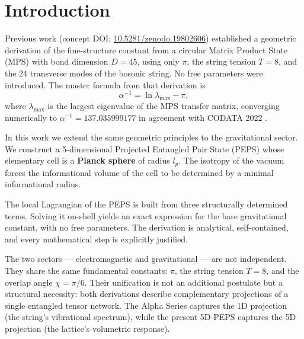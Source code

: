 \documentclass[12pt]{article}
\begin{document}
\begin{abstract}
\noindent\textbf{Keywords:} Lagrangian, quantum gravity, GUT, grand unified theory, PEPS, MPS, tensor networks, topological invariants, fine-structure constant, Alpha Series, Polyakov string, Planck sphere, holographic principle, spinorial projection, tesseract volume, bare gravitational coupling, dimensional reduction, lattice quantum field theory, Monte Carlo simulation, annealing, symmetry breaking, hinge mechanism, topological locking, 5D field theory, geometric unification, no free parameters, falsifiable theory.

\noindent\textbf{Alpha Series concept DOI:} \href{https://doi.org/10.5281/zenodo.19802606}{10.5281/zenodo.19802606}
\end{abstract}

\tableofcontents

\newpage

\section{Introduction}

Previous work (concept DOI: \href{https://doi.org/10.5281/zenodo.19802606}{10.5281/zenodo.19802606}) established a geometric derivation of the fine-structure constant from a circular Matrix Product State (MPS) with bond dimension \(D = 45\), using only \(\pi\), the string tension \(T = 8\), and the 24 transverse modes of the bosonic string. No free parameters were introduced. The master formula from that derivation is
\[
\alpha^{-1} = \ln\lambda_{\text{max}} - \pi,
\]
where \(\lambda_{\text{max}}\) is the largest eigenvalue of the MPS transfer matrix, converging numerically to \(\alpha^{-1} = 137.035999177\) in agreement with CODATA 2022 \cite{codata2022}.

In this work we extend the same geometric principles to the gravitational sector. We construct a 5-dimensional Projected Entangled Pair State (PEPS) \cite{Verstraete2004} whose elementary cell is a \textbf{Planck sphere} of radius \(l_p\). The isotropy of the vacuum forces the informational volume of the cell to be determined by a minimal informational radius.

The local Lagrangian of the PEPS is built from three structurally determined terms. Solving it on-shell yields an exact expression for the bare gravitational constant, with no free parameters. The derivation is analytical, self-contained, and every mathematical step is explicitly justified.

The two sectors — electromagnetic and gravitational — are not independent. They share the same fundamental constants: \(\pi\), the string tension \(T = 8\), and the overlap angle \(\chi = \pi/6\). Their unification is not an additional postulate but a structural necessity: both derivations describe complementary projections of a single entangled tensor network. The Alpha Series captures the 1D projection (the string's vibrational spectrum), while the present 5D PEPS captures the 5D projection (the lattice's volumetric response).
\end{document}
